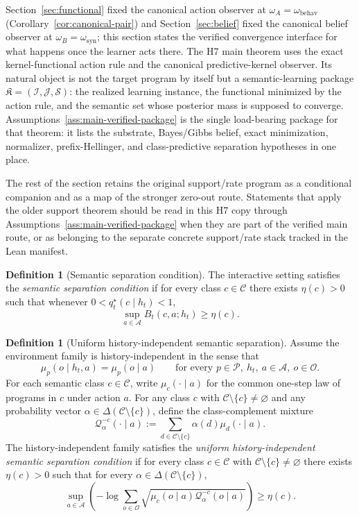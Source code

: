 \documentclass[11pt]{article}
\theoremstyle{definition}
\newtheorem{definition}[theorem]{Definition}
\theoremstyle{remark}
\newcommand{\Acal}{\mathcal{A}}
\newcommand{\Ccal}{\mathcal{C}}
\newcommand{\Ocal}{\mathcal{O}}
\newcommand{\Pcal}{\mathcal{P}}
\newcommand{\Qcal}{\mathcal{Q}}
\newcommand{\Scal}{\mathcal{S}}
\begin{document}
Section~\ref{sec:functional} fixed the canonical action observer at $\omega_A=\omega_{\mathrm{behav}}$ (Corollary~\ref{cor:canonical-pair}) and Section~\ref{sec:belief} fixed the canonical belief observer at $\omega_B=\omega_{\mathrm{syn}}$; this section states the verified convergence interface for what happens once the learner acts there. The H7 main theorem uses the exact kernel-functional action rule and the canonical predictive-kernel observer. Its natural object is not the target program by itself but a semantic-learning package $\mathfrak K=(\mathcal I,\mathcal J,\Scal)$: the realized learning instance, the functional minimized by the action rule, and the semantic set whose posterior mass is supposed to converge. Assumptions~\ref{ass:main-verified-package} is the single load-bearing package for that theorem: it lists the substrate, Bayes/Gibbs belief, exact minimization, normalizer, prefix-Hellinger, and class-predictive separation hypotheses in one place.

The rest of the section retains the original support/rate program as a conditional companion and as a map of the stronger zero-out route. Statements that apply the older support theorem should be read in this H7 copy through Assumptions~\ref{ass:main-verified-package} when they are part of the verified main route, or as belonging to the separate concrete support/rate stack tracked in the Lean manifest.

\begin{definition}[Semantic separation condition]
\label{def:sep-condition}
The interactive setting satisfies the \emph{semantic separation condition} if for every class $c\in\Ccal$ there exists $\eta(c)>0$ such that whenever $0<q_t^\star(c\mid h_t)<1$,
\[
\sup_{a\in\Acal}B_t(c,a;h_t)\ge \eta(c).
\]
\end{definition}

\begin{definition}[Uniform history-independent semantic separation]
\label{def:uniform-history-independent-separation}
Assume the environment family is history-independent in the sense that
\[
\mu_p(o\mid h_t,a)=\mu_p(o\mid a)
\qquad
\text{for every }p\in\Pcal,\ h_t,\ a\in\Acal,\ o\in\Ocal.
\]
For each semantic class $c\in\Ccal$, write $\mu_c(\cdot\mid a)$ for the common one-step law of programs in $c$ under action $a$. For any class $c$ with $\Ccal\setminus\{c\}\neq\varnothing$ and any probability vector $\alpha\in\Delta(\Ccal\setminus\{c\})$, define the class-complement mixture
\[
\Qcal_{\alpha}^{-c}(\cdot\mid a)
:=
\sum_{d\in\Ccal\setminus\{c\}}\alpha(d)\mu_d(\cdot\mid a).
\]
The history-independent family satisfies the \emph{uniform history-independent semantic separation condition} if for every class $c\in\Ccal$ with $\Ccal\setminus\{c\}\neq\varnothing$ there exists $\eta(c)>0$ such that for every $\alpha\in\Delta(\Ccal\setminus\{c\})$,
\[
\sup_{a\in\Acal}
\left(
-\log\sum_{o\in\Ocal}\sqrt{\mu_c(o\mid a)\Qcal_{\alpha}^{-c}(o\mid a)}
\right)
\ge \eta(c).
\]
\end{definition}
\end{document}

